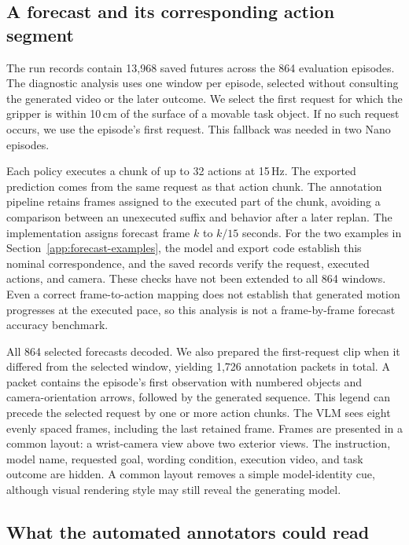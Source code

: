 \documentclass{article}
\begin{document}
\subsection{A forecast and its corresponding action segment}

The run records contain 13,968 saved futures across the 864 evaluation episodes. The diagnostic analysis uses one window per episode, selected without consulting the generated video or the later outcome. We select the first request for which the gripper is within 10\,cm of the surface of a movable task object. If no such request occurs, we use the episode's first request. This fallback was needed in two Nano episodes.

Each policy executes a chunk of up to 32 actions at 15\,Hz. The exported prediction comes from the same request as that action chunk. The annotation pipeline retains frames assigned to the executed part of the chunk, avoiding a comparison between an unexecuted suffix and behavior after a later replan. The implementation assigns forecast frame $k$ to $k/15$ seconds. For the two examples in Section~\ref{app:forecast-examples}, the model and export code establish this nominal correspondence, and the saved records verify the request, executed actions, and camera. These checks have not been extended to all 864 windows. Even a correct frame-to-action mapping does not establish that generated motion progresses at the executed pace, so this analysis is not a frame-by-frame forecast accuracy benchmark.

All 864 selected forecasts decoded. We also prepared the first-request clip when it differed from the selected window, yielding 1,726 annotation packets in total. A packet contains the episode's first observation with numbered objects and camera-orientation arrows, followed by the generated sequence. This legend can precede the selected request by one or more action chunks. The VLM sees eight evenly spaced frames, including the last retained frame. Frames are presented in a common layout: a wrist-camera view above two exterior views. The instruction, model name, requested goal, wording condition, execution video, and task outcome are hidden. A common layout removes a simple model-identity cue, although visual rendering style may still reveal the generating model.

\subsection{What the automated annotators could read}
\end{document}
